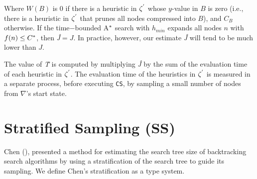 Where $W(B)$ is 0 if there is a heuristic in $\zeta\sp{'}$ whose $y$-value in $B$ is zero (i.e., there is a heuristic in $\zeta\sp{'}$ that prunes all nodes compressed into $B$), and $C_{B}$ otherwise. If the time$-$bounded A$\sp{*}$ search with $h_{min}$ expands all nodes $n$ with $f(n) \leq C\sp{*}$, then \textit{\^{J}}$=J$. In practice, however, our estimate \textit{\^{J}} will tend to be much lower than $J$.

The value of \textit{\^{T}} is computed by multiplying \textit{\^{J}} by the sum of the evaluation time of each heuristic in $\zeta\sp{'}$. The evaluation time of the heuristics in $\zeta\sp{'}$ is measured in a separate process, before executing \texttt{CS}, by sampling a small number of nodes from $\nabla$'s start state.

\section{Stratified Sampling (SS)}
Chen (\citeyear{chen1992heuristic}), presented a method for estimating the search tree size of backtracking search algorithms by using a stratification of the search tree to guide its sampling. We define Chen’s stratification as a type system.

